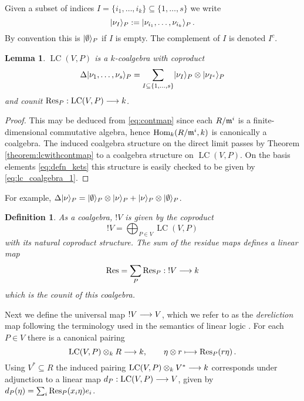 \documentclass[english,letter paper,12pt,reqno]{article}
\DeclarePairedDelimiter\ket{\lvert}{\rangle}
\newtheorem{lemma}[theorem]{Lemma}
\theoremstyle{example}
\newtheorem{definition}[theorem]{Definition}
\numberwithin{equation}{section}
\def\Hom{\operatorname{Hom}}
\def\vacu{\ket{\emptyset}}
\DeclareMathOperator{\LC}{LC}
\begin{document}
Given a subset of indices $I =  \{ i_1, \ldots, i_k \} \subseteq \{ 1, \ldots, s \}$ we write
\begin{equation}\label{eq:nu_I}
\ket{ \nu_I }_P := \ket{ \nu_{i_1}, \ldots, \nu_{i_k} }_P\,.
\end{equation}
By convention this is $\vacu_P$ if $I$ is empty. The complement of $I$ is denoted $I^c$.

\begin{lemma}\label{lemma:lc_coalgebra} $\LC(V,P)$ is a $k$-coalgebra with coproduct
\begin{equation}\label{eq:lc_coalgebra_1}
\Delta \ket{ \nu_1, \ldots, \nu_s }_P = \sum_{I \subseteq \{ 1, \ldots, s \}} \ket{ \nu_I }_P \otimes \ket{ \nu_{I^c} }_P
\end{equation}
and counit $\Res_P: \LC(V,P) \lto k$.
\end{lemma}
\begin{proof}
This may be deduced from \eqref{eq:contmap} since each $R/\mathfrak{m}^i$ is a finite-dimensional commutative algebra, hence $\Hom_k( R/\mf{m}^i, k )$ is canonically a coalgebra. The induced coalgebra structure on the direct limit passes by Theorem \ref{theorem:lcwithcontmap} to a coalgebra structure on $\LC(V,P)$. On the basis elements \eqref{eq:defn_kets} this structure is easily checked to be given by \eqref{eq:lc_coalgebra_1}.
\end{proof}

For example, $\Delta \ket{\nu}_P = \vacu_P \otimes \ket{\nu}_P + \ket{\nu}_P \otimes \vacu_P$.

\begin{definition}\label{definition:bang} As a coalgebra, $!V$ is given by the coproduct
\begin{equation}
!V = \bigoplus_{P \in V} \LC(V,P)
\end{equation}
with its natural coproduct structure. The sum of the residue maps defines a linear map
\begin{equation}\label{eq:residue_der}
\operatorname{Res}\!\, = \sum_P \operatorname{Res}\!_P: {!}V \longrightarrow k
\end{equation}
which is the counit of this coalgebra.
\end{definition}

Next we define the universal map ${!} V \longrightarrow V$, which we refer to as the \emph{dereliction} map following the terminology used in the semantics of linear logic \cite{mellies}. For each $P \in V$ there is a canonical pairing
\[
\LC(V,P) \otimes_k R \lto k, \qquad \eta \otimes r \longmapsto \Res_P(r \eta)\,.
\]
Using $V^* \subseteq R$ the induced pairing $\LC(V,P) \otimes_k V^* \lto k$ corresponds under adjunction to a linear map $d_P: \LC(V,P) \lto V$, given by $d_P( \eta ) = \sum_i \operatorname{Res}\!_P( x_i \eta ) e_i$.
\end{document}
